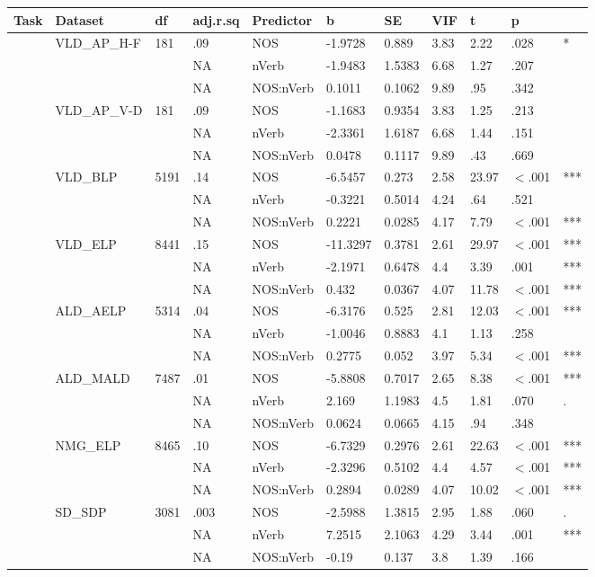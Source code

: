 \begin{table}[ht]
\centering
\begingroup\normalsize
\begin{tabular}{lllllllllll}
  \hline
Task & Dataset & df & adj.r.sq & Predictor & b & SE & VIF & t & p &  \\ 
  \hline
 & VLD\_AP\_H-F & 181 & .09 & NOS & -1.9728 & 0.889 & 3.83 & 2.22 & .028 & * \\ 
   &  &  & NA & nVerb & -1.9483 & 1.5383 & 6.68 & 1.27 & .207 &   \\ 
   &  &  & NA & NOS:nVerb & 0.1011 & 0.1062 & 9.89 & .95 & .342 &   \\ 
   & VLD\_AP\_V-D & 181 & .09 & NOS & -1.1683 & 0.9354 & 3.83 & 1.25 & .213 &   \\ 
   &  &  & NA & nVerb & -2.3361 & 1.6187 & 6.68 & 1.44 & .151 &   \\ 
   &  &  & NA & NOS:nVerb & 0.0478 & 0.1117 & 9.89 & .43 & .669 &   \\ 
   & VLD\_BLP & 5191 & .14 & NOS & -6.5457 & 0.273 & 2.58 & 23.97 & $<$.001 & *** \\ 
   &  &  & NA & nVerb & -0.3221 & 0.5014 & 4.24 & .64 & .521 &   \\ 
   &  &  & NA & NOS:nVerb & 0.2221 & 0.0285 & 4.17 & 7.79 & $<$.001 & *** \\ 
   & VLD\_ELP & 8441 & .15 & NOS & -11.3297 & 0.3781 & 2.61 & 29.97 & $<$.001 & *** \\ 
   &  &  & NA & nVerb & -2.1971 & 0.6478 & 4.4 & 3.39 & .001 & *** \\ 
   &  &  & NA & NOS:nVerb & 0.432 & 0.0367 & 4.07 & 11.78 & $<$.001 & *** \\ 
   & ALD\_AELP & 5314 & .04 & NOS & -6.3176 & 0.525 & 2.81 & 12.03 & $<$.001 & *** \\ 
   &  &  & NA & nVerb & -1.0046 & 0.8883 & 4.1 & 1.13 & .258 &   \\ 
   &  &  & NA & NOS:nVerb & 0.2775 & 0.052 & 3.97 & 5.34 & $<$.001 & *** \\ 
   & ALD\_MALD & 7487 & .01 & NOS & -5.8808 & 0.7017 & 2.65 & 8.38 & $<$.001 & *** \\ 
   &  &  & NA & nVerb & 2.169 & 1.1983 & 4.5 & 1.81 & .070 & . \\ 
   &  &  & NA & NOS:nVerb & 0.0624 & 0.0665 & 4.15 & .94 & .348 &   \\ 
   & NMG\_ELP & 8465 & .10 & NOS & -6.7329 & 0.2976 & 2.61 & 22.63 & $<$.001 & *** \\ 
   &  &  & NA & nVerb & -2.3296 & 0.5102 & 4.4 & 4.57 & $<$.001 & *** \\ 
   &  &  & NA & NOS:nVerb & 0.2894 & 0.0289 & 4.07 & 10.02 & $<$.001 & *** \\ 
   & SD\_SDP & 3081 & .003 & NOS & -2.5988 & 1.3815 & 2.95 & 1.88 & .060 & . \\ 
   &  &  & NA & nVerb & 7.2515 & 2.1063 & 4.29 & 3.44 & .001 & *** \\ 
   &  &  & NA & NOS:nVerb & -0.19 & 0.137 & 3.8 & 1.39 & .166 &   \\ 
   \hline
\end{tabular}
\endgroup
\end{table}
